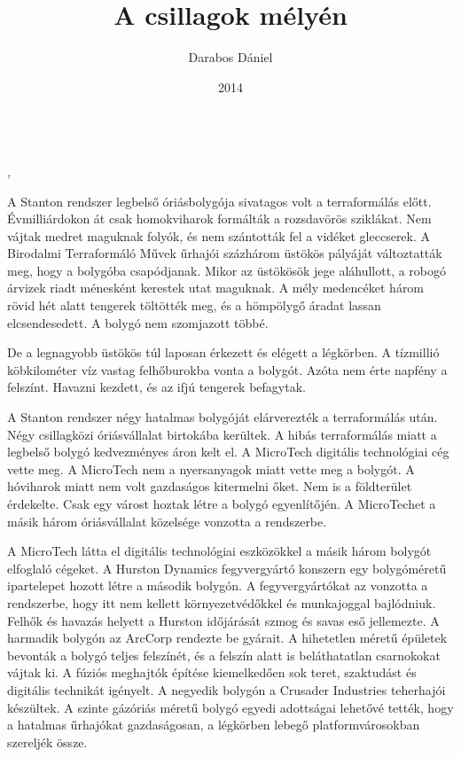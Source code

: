 \documentclass[10pt]{memoir}
\author{Darabos Dániel}
\date{2014}
\title{A csillagok mélyén}
\begin{document}
\begin{titlingpage}
  \centering
  \vspace*{0.2\textheight}
  {\Huge \thetitle}\\[\baselineskip]
  {\large\itshape \theauthor, \thedate}
\end{titlingpage}

\vspace*{0.4\textheight}

\begin{itshape}
\noindent
A Stanton rendszer legbelső óriásbolygója sivatagos volt a terraformálás előtt.
Évmilliárdokon át csak homokviharok formálták a rozsdavörös sziklákat. Nem
vájtak medret maguknak folyók, és nem szántották fel a vidéket gleccserek. A
Birodalmi Terraformáló Művek űrhajói százhárom üstökös pályáját változtatták
meg, hogy a bolygóba csapódjanak. Mikor az üstökösök jege aláhullott, a robogó
árvizek riadt ménesként kerestek utat maguknak. A mély medencéket három rövid
hét alatt tengerek töltötték meg, és a hömpölygő áradat lassan elcsendesedett.
A bolygó nem szomjazott többé.

De a legnagyobb üstökös túl laposan érkezett és elégett a légkörben. A
tízmillió köbkilométer víz vastag felhőburokba vonta a bolygót. Azóta nem érte
napfény a felszínt. Havazni kezdett, és az ifjú tengerek befagytak.

A Stanton rendszer négy hatalmas bolygóját elárverezték a terraformálás után.
Négy csillagközi óriásvállalat birtokába kerültek. A hibás terraformálás miatt
a legbelső bolygó kedvezményes áron kelt el. A MicroTech digitális technológiai
cég vette meg. A MicroTech nem a nyersanyagok miatt vette meg a bolygót. A
hóviharok miatt nem volt gazdaságos kitermelni őket. Nem is a földterület
érdekelte. Csak egy várost hoztak létre a bolygó egyenlítőjén. A MicroTechet a
másik három óriásvállalat közelsége vonzotta a rendszerbe.

A MicroTech látta el digitális technológiai eszközökkel a másik három bolygót
elfoglaló cégeket. A Hurston Dynamics fegyvergyártó konszern egy bolygóméretű
ipartelepet hozott létre a második bolygón. A fegyvergyártókat az vonzotta a
rendszerbe, hogy itt nem kellett környezetvédőkkel és munkajoggal bajlódniuk.
Felhők és havazás helyett a Hurston időjárását szmog és savas eső jellemezte. A
harmadik bolygón az ArcCorp rendezte be gyárait. A hihetetlen méretű épületek
bevonták a bolygó teljes felszínét, és a felszín alatt is beláthatatlan
csarnokokat vájtak ki. A fúziós meghajtók építése kiemelkedően sok teret,
szaktudást és digitális technikát igényelt. A negyedik bolygón a Crusader
Industries teherhajói készültek. A szinte gázóriás méretű bolygó egyedi
adottságai lehetővé tették, hogy a hatalmas űrhajókat gazdaságosan, a légkörben
lebegő platformvárosokban szereljék össze.


\end{itshape}
\end{document}
